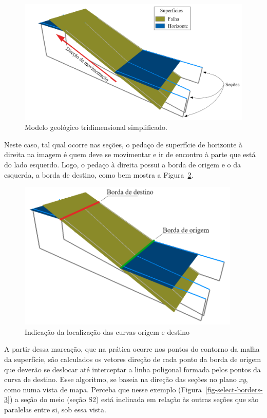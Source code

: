 \begin{figure} [H]
  \begin{center}
    \includegraphics[width=350pt]{images/fig-select-borders-1}
    \caption{Modelo geológico tridimensional simplificado.}\label{fig-select-borders-1}
  \end{center}
\end{figure}

Neste caso, tal qual ocorre nas seções, o pedaço de superfície de horizonte à direita na imagem é quem deve se movimentar e ir de encontro à parte que está do lado esquerdo. Logo, o pedaço à direita possui a borda de origem e o da esquerda, a borda de destino, como bem mostra a Figura~\ref{fig-select-borders-2}.

\begin{figure} [H]
  \begin{center}
    \includegraphics[width=300pt]{images/fig-select-borders-2}
    \caption{Indicação da localização das curvas origem e destino}\label{fig-select-borders-2}
  \end{center}
\end{figure}

A partir dessa marcação, que na prática ocorre nos pontos do contorno da malha da superfície, são calculados os vetores direção de cada ponto da borda de origem que deverão se deslocar até interceptar a linha poligonal formada pelos pontos da curva de destino. Esse algoritmo, se baseia na direção das seções no plano \textit{xy}, como numa vista de mapa. Perceba que nesse exemplo (Figura~\ref{fig-select-borders-3}) a seção do meio (seção S2) está inclinada em relação às outras seções que são paralelas entre si, sob essa vista.

